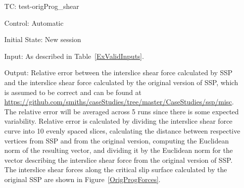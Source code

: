 \documentclass[12pt, titlepage]{article}
\newcounter{testnum} %
\newcommand{\progname}{SSP}
\begin{document}
\begin{enumerate}[label=TC\arabic*:,ref={\arabic*}]
Output: Relative error between the interslice normal force calculated by 
\progname{} and the interslice normal force calculated by the original version 
of \progname{}, which is assumed to be correct and can be found at 
\newline
\href{https://github.com/smiths/caseStudies/tree/master/CaseStudies/ssp/misc}
{https://github.com/smiths/caseStudies/tree/master/CaseStudies/ssp/misc}. The 
relative error will be averaged across 5 runs since there is some expected 
variability.
Relative error is calculated by dividing the interslice normal force curve into 
10 evenly spaced slices, calculating the distance between respective vertices 
from \progname{} and from the original version, computing the Euclidean norm of 
the resulting vector, and dividing it by the Euclidean norm for the vector 
describing the interslice normal force from the original version of 
\progname{}. The interslice normal forces along the critical slip surface 
calculated by the original \progname{} are shown in Figure~\ref{OrigProgForces}.

How test will be performed: Automated test on unit testing framework

\item [TC\refstepcounter{testnum}\thetestnum: \label{TC_OrigProgShear}] 
test-origProg\_shear

Control: Automatic

Initial State: New session

Input: As described in Table~\ref{ExValidInputs}.

Output: Relative error between the interslice shear force calculated by 
\progname{} and the interslice shear force calculated by the original version 
of \progname{}, which is assumed to be correct and can be found at 
\newline
\href{https://github.com/smiths/caseStudies/tree/master/CaseStudies/ssp/misc}
{https://github.com/smiths/caseStudies/tree/master/CaseStudies/ssp/misc}. The 
relative error will be averaged across 5 runs since there is some expected 
variability.
Relative error is calculated by dividing the interslice shear force curve into 
10 evenly spaced slices, calculating the distance between respective vertices 
from \progname{} and from the original version, computing the Euclidean norm of 
the resulting vector, and dividing it by the Euclidean norm for the vector 
describing the interslice shear force from the original version of \progname{}. 
The interslice shear forces along the critical slip surface 
calculated by the original \progname{} are shown in Figure~\ref{OrigProgForces}.


\end{enumerate}
\end{document}
